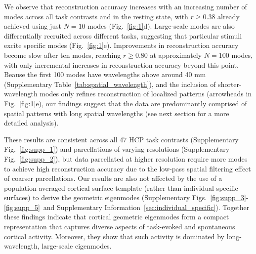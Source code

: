 \documentclass[sn-mathphys-num]{sn-jnl}%
\theoremstyle{thmstyleone}%
\theoremstyle{thmstyletwo}%
\theoremstyle{thmstylethree}%
\begin{document}
We observe that reconstruction accuracy increases with an increasing number of modes across all task contrasts and in the resting state, with $ r \ge 0.38 $ already achieved using just $ N=10 $ modes (Fig.~\ref{fig:1}d). 
Large-scale modes are also differentially recruited across different tasks, suggesting that particular stimuli excite specific modes (Fig.~\ref{fig:1}e). 
Improvements in reconstruction accuracy become slow after ten modes, reaching $ r \geq 0.80 $ at approximately $ N=100 $ modes, with only incremental increases in reconstruction accuracy beyond this point. 
Beause the first 100 modes have wavelengths above around 40 mm (Supplementary Table~\ref{tab:spatial_wavelength}), 
and the inclusion of shorter-wavelength modes only refines reconstruction of localized patterns (arrowheads in Fig.~\ref{fig:1}e), our findings suggest that the data are predominantly comprised of spatial patterns with long spatial wavelengths (see next section for a more detailed analysis).


These results are consistent across all 47 HCP task contrasts (Supplementary Fig.~\ref{fig:supp_1}) and parcellations of varying resolutions (Supplementary Fig.~\ref{fig:supp_2}), but data parcellated at higher resolution require more modes to achieve high reconstruction accuracy due to the low-pass spatial filtering effect of coarser parcellations. 
Our results are also not affected by the use of a population-averaged cortical surface template (rather than individual-specific surfaces) to derive the geometric eigenmodes (Supplementary Figs.~\ref{fig:supp_3}-\ref{fig:supp_5}~and Supplementary Information~\ref{sec:individual_specific}). 
Together these findings indicate that cortical geometric eigenmodes form a compact representation that captures diverse aspects of task-evoked and spontaneous cortical activity. 
Moreover, they show that such activity is dominated by long-wavelength, large-scale eigenmodes.
\end{document}
